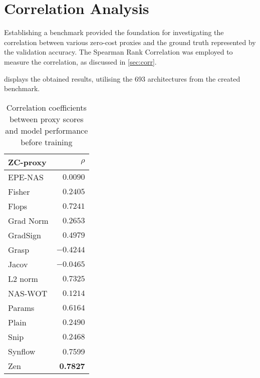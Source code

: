 \section{Correlation Analysis}\label{res:correlation}

Establishing a benchmark provided the foundation for investigating the correlation between various zero-cost proxies and the ground truth represented by the validation accuracy. The Spearman Rank Correlation was employed to measure the correlation, as discussed in \cref{sec:corr}. 

 displays the obtained results, utilising the 693 architectures from the created benchmark. 
\clearpage

\begin{table}[h]
\caption{Correlation coefficients between proxy scores and model performance before training}
\centering
\begin{tabular}{lr}
\textbf{ZC-proxy} & \textbf{$\rho$} \\ \hline
\multicolumn{1}{l|}{\cellcolor{verylightgray}EPE-NAS} & \cellcolor{verylightgray}$0.0090$ \\
\multicolumn{1}{l|}{Fisher} & $0.2405$ \\
\multicolumn{1}{l|}{\cellcolor{verylightgray}Flops} & \cellcolor{verylightgray}$0.7241$ \\
\multicolumn{1}{l|}{Grad Norm} & $0.2653$ \\
\multicolumn{1}{l|}{\cellcolor{verylightgray}GradSign} & \cellcolor{verylightgray}$0.4979$ \\
\multicolumn{1}{l|}{Grasp} & $-0.4244$ \\
\multicolumn{1}{l|}{\cellcolor{verylightgray}Jacov} & \cellcolor{verylightgray}$-0.0465$ \\
\multicolumn{1}{l|}{L2 norm} & $0.7325$ \\
\multicolumn{1}{l|}{\cellcolor{verylightgray}NAS-WOT} & \cellcolor{verylightgray}$0.1214$ \\
\multicolumn{1}{l|}{Params} & $0.6164$ \\
\multicolumn{1}{l|}{\cellcolor{verylightgray}Plain} & \cellcolor{verylightgray}$0.2490$ \\
\multicolumn{1}{l|}{Snip} & $0.2468$ \\
\multicolumn{1}{l|}{\cellcolor{verylightgray}Synflow} & \cellcolor{verylightgray}0.7599 \\
\multicolumn{1}{l|}{Zen} & \textbf{0.7827} \\
\end{tabular}
\label{tab:corr}
\end{table}



